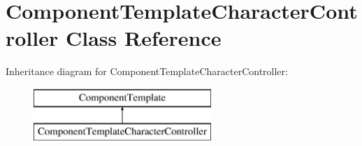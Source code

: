 \hypertarget{classComponentTemplateCharacterController}{
\section{\-Component\-Template\-Character\-Controller \-Class \-Reference}
\label{d5/d37/classComponentTemplateCharacterController}
}
\-Inheritance diagram for \-Component\-Template\-Character\-Controller\-:\begin{figure}[H]
\begin{center}
\leavevmode
\includegraphics[height=2.000000cm]{d5/d37/classComponentTemplateCharacterController}
\end{center}
\end{figure}
